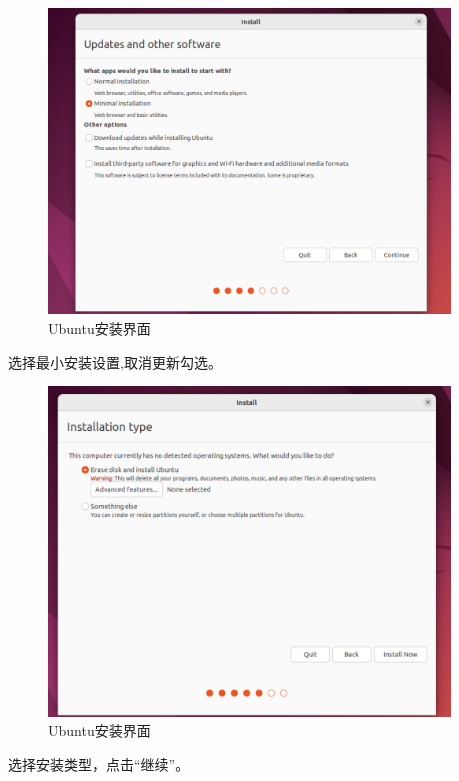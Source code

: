 \documentclass[UTF8]{ctexart}
\begin{document}
\begin{figure}[H]
    \centering
    \includegraphics[width=0.95\textwidth]{picture/Screenshot 2024-10-14 175055.png}
    \caption{Ubuntu安装界面}
\end{figure}
选择最⼩安装设置,取消更新勾选。

\begin{figure}[H]
    \centering
    \includegraphics[width=0.95\textwidth]{picture/Screenshot 2024-10-14 174957.png}
    \caption{Ubuntu安装界面}
\end{figure}
选择安装类型，点击“继续”。
\end{document}
